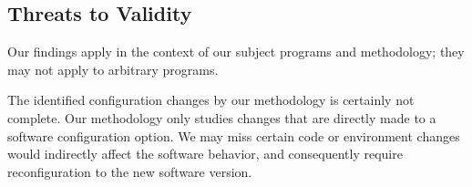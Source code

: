 










\subsection{Threats to Validity}

Our findings apply in the context of our subject programs and methodology;
they may not apply to arbitrary programs.

The identified configuration changes by our methodology is certainly not complete.
Our methodology only studies changes that are directly made to a
software configuration option. We may miss certain
code or environment changes would indirectly affect the software behavior,
and consequently require reconfiguration to the new software version.




